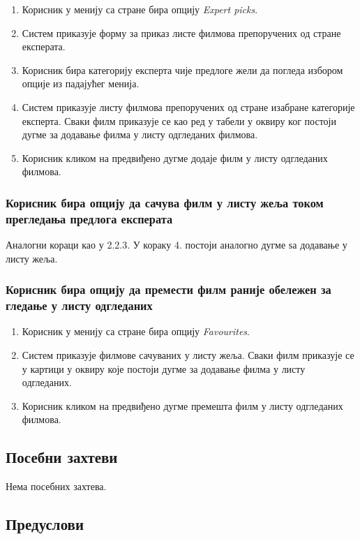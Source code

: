 \begin{enumerate}
    \item Корисник у менију са стране бира опцију \textit{Expert picks}.
    \item Систем приказује форму за приказ листе филмова препоручених од стране експерата.
    \item Корисник бира категорију експерта чије предлоге жели да погледа избором опције из падајућег менија.
    \item Систем приказује листу филмова препоручених од стране изабране категорије експерта. Сваки филм приказује 
    се као ред у табели у оквиру ког постоји дугме за додавање филма у листу одгледаних филмова.
    \item Корисник кликом на предвиђено дугме додаје филм у листу одгледаних филмова.
\end{enumerate}

\subsubsection{Корисник бира опцију да сачува филм у листу жеља током прегледања предлога експерата}

Аналогни кораци као у 2.2.3. У кораку 4. постоји аналогно дугме ѕа додавање у листу жеља.

\subsubsection{Корисник бира опцију да премести филм раније обележен за гледање у листу одгледаних}

\begin{enumerate}
    \item Корисник у менију са стране бира опцију \textit{Favourites}.
    \item Систем приказује филмове сачуваних у листу жеља. Сваки филм приказује се у картици 
    у оквиру које постоји дугме за додавање филма у листу одгледаних.
    \item Корисник кликом на предвиђено дугме премешта филм у листу одгледаних филмова.
\end{enumerate}

\subsection{Посебни захтеви}

Нема посебних захтева.

\subsection{Предуслови}

